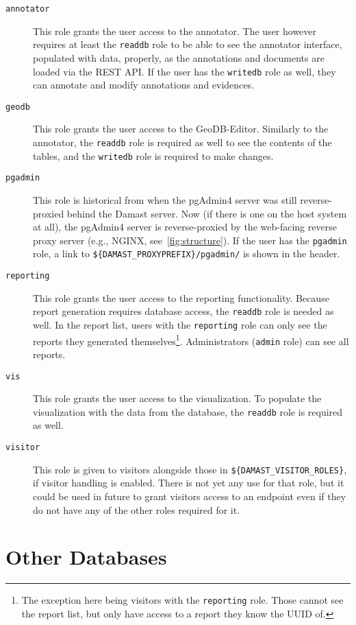 \begin{description}
  \item[\texttt{annotator}]
    This role grants the user access to the annotator.
    The user however requires at least the \verb!readdb! role to be able to see the annotator interface, populated with data, properly, as the annotations and documents are loaded via the REST API.
    If the user has the \verb!writedb! role as well, they can annotate and modify annotations and evidences.
  \item[\texttt{geodb}]
    This role grants the user access to the GeoDB-Editor.
    Similarly to the annotator, the \verb!readdb! role is required as well to see the contents of the tables, and the \verb!writedb! role is required to make changes.
  \item[\texttt{pgadmin}]
    This role is historical from when the pgAdmin4 server was still reverse-proxied behind the Damast server.
    Now (if there is one on the host system at all), the pgAdmin4 server is reverse-proxied by the web-facing reverse proxy server (e.g., NGINX, see~\cref{fig:structure}).
    If the user has the \verb!pgadmin! role, a link to \verb!${DAMAST_PROXYPREFIX}/pgadmin/! is shown in the header.
  \item[\texttt{reporting}]
    This role grants the user access to the reporting functionality.
    Because report generation requires database access, the \verb!readdb! role is needed as well.
    In the report list, users with the \verb!reporting! role can only see the reports they generated themselves\footnote{%
      The exception here being visitors with the \texttt{reporting} role.
      Those cannot see the report list, but only have access to a report they know the UUID of.
    }.
    Administrators (\verb!admin! role) can see all reports.
  \item[\texttt{vis}]
    This role grants the user access to the visualization.
    To populate the visualization with the data from the database, the \verb!readdb! role is required as well.
  \item[\texttt{visitor}]
    This role is given to visitors alongside those in \verb!${DAMAST_VISITOR_ROLES}!, if visitor handling is enabled.
    There is not yet any use for that role, but it could be used in future to grant visitors access to an endpoint even if they do not have any of the other roles required for it.
\end{description}


\section{Other Databases}

